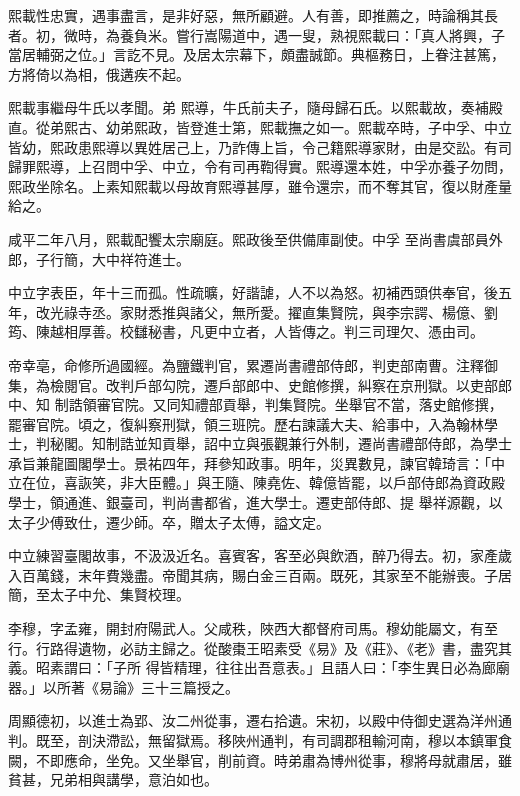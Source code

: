 \begin{pinyinscope}
 熙載性忠實，遇事盡言，是非好惡，無所顧避。人有善，即推薦之，時論稱其長者。初，微時，為養負米。嘗行嵩陽道中，遇一叟，熟視熙載曰：「真人將興，子當居輔弼之位。」言訖不見。及居太宗幕下，頗盡誠節。典樞務日，上眷注甚篤，方將倚以為相，俄遘疾不起。



 熙載事繼母牛氏以孝聞。弟
 熙導，牛氏前夫子，隨母歸石氏。以熙載故，奏補殿直。從弟熙古、幼弟熙政，皆登進士第，熙載撫之如一。熙載卒時，子中孚、中立皆幼，熙政患熙導以異姓居己上，乃詐傳上旨，令己籍熙導家財，由是交訟。有司歸罪熙導，上召問中孚、中立，令有司再鞫得實。熙導還本姓，中孚亦養子勿問，熙政坐除名。上素知熙載以母故育熙導甚厚，雖令還宗，而不奪其官，復以財產量給之。



 咸平二年八月，熙載配饗太宗廟庭。熙政後至供備庫副使。中孚
 至尚書虞部員外郎，子行簡，大中祥符進士。



 中立字表臣，年十三而孤。性疏曠，好諧謔，人不以為怒。初補西頭供奉官，後五年，改光祿寺丞。家財悉推與諸父，無所愛。擢直集賢院，與李宗諤、楊億、劉筠、陳越相厚善。校讎秘書，凡更中立者，人皆傳之。判三司理欠、憑由司。



 帝幸亳，命修所過國經。為鹽鐵判官，累遷尚書禮部侍郎，判吏部南曹。注釋御集，為檢閱官。改判戶部勾院，遷戶部郎中、史館修撰，糾察在京刑獄。以吏部郎中、知
 制誥領審官院。又同知禮部貢舉，判集賢院。坐舉官不當，落史館修撰，罷審官院。頃之，復糾察刑獄，領三班院。歷右諫議大夫、給事中，入為翰林學士，判秘閣。知制誥並知貢舉，詔中立與張觀兼行外制，遷尚書禮部侍郎，為學士承旨兼龍圖閣學士。景祐四年，拜參知政事。明年，災異數見，諫官韓琦言：「中立在位，喜詼笑，非大臣體。」與王隨、陳堯佐、韓億皆罷，以戶部侍郎為資政殿學士，領通進、銀臺司，判尚書都省，進大學士。遷吏部侍郎、提
 舉祥源觀，以太子少傅致仕，遷少師。卒，贈太子太傅，謚文定。



 中立練習臺閣故事，不汲汲近名。喜賓客，客至必與飲酒，醉乃得去。初，家產歲入百萬錢，末年費幾盡。帝聞其病，賜白金三百兩。既死，其家至不能辦喪。子居簡，至太子中允、集賢校理。



 李穆，字孟雍，開封府陽武人。父咸秩，陜西大都督府司馬。穆幼能屬文，有至行。行路得遺物，必訪主歸之。從酸棗王昭素受《易》及《莊》、《老》書，盡究其義。昭素謂曰：「子所
 得皆精理，往往出吾意表。」且語人曰：「李生異日必為廊廟器。」以所著《易論》三十三篇授之。



 周顯德初，以進士為郢、汝二州從事，遷右拾遺。宋初，以殿中侍御史選為洋州通判。既至，剖決滯訟，無留獄焉。移陜州通判，有司調郡租輸河南，穆以本鎮軍食闕，不即應命，坐免。又坐舉官，削前資。時弟肅為博州從事，穆將母就肅居，雖貧甚，兄弟相與講學，意泊如也。




\end{pinyinscope}
